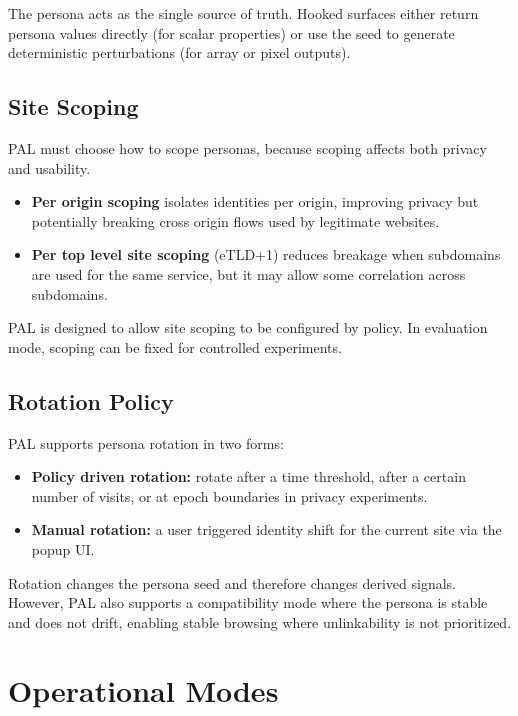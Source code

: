 \documentclass[11pt]{report}
\begin{document}
The persona acts as the single source of truth. Hooked surfaces either return persona values directly (for scalar properties) or use the seed to generate deterministic perturbations (for array or pixel outputs).

\subsection{Site Scoping}

PAL must choose how to scope personas, because scoping affects both privacy and usability.

\begin{itemize}
    \item \textbf{Per origin scoping} isolates identities per origin, improving privacy but potentially breaking cross origin flows used by legitimate websites.
    \item \textbf{Per top level site scoping} (eTLD+1) reduces breakage when subdomains are used for the same service, but it may allow some correlation across subdomains.
\end{itemize}

PAL is designed to allow site scoping to be configured by policy. In evaluation mode, scoping can be fixed for controlled experiments.

\subsection{Rotation Policy}

PAL supports persona rotation in two forms:

\begin{itemize}
    \item \textbf{Policy driven rotation:} rotate after a time threshold, after a certain number of visits, or at epoch boundaries in privacy experiments.
    \item \textbf{Manual rotation:} a user triggered identity shift for the current site via the popup UI.
\end{itemize}

Rotation changes the persona seed and therefore changes derived signals. However, PAL also supports a compatibility mode where the persona is stable and does not drift, enabling stable browsing where unlinkability is not prioritized.

\section{Operational Modes}
\end{document}
